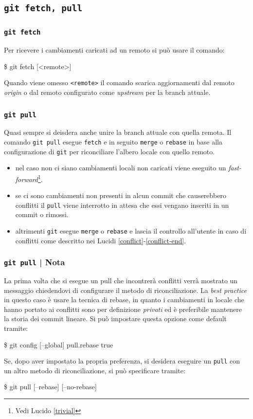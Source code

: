 \documentclass{beamer}
\begin{document}
\subsection{\texttt{git fetch, pull}}
\begin{frame}
  \frametitle{\texttt{git fetch}}
  Per ricevere i cambiamenti caricati ad un remoto si pu\`o usare il comando:
  \begin{semiverbatim}
  \$ git fetch [<remote>]
  \end{semiverbatim} \pause
  Quando viene omesso \texttt{<remote>} il comando scarica aggiornamenti dal
  remoto \emph{origin} o dal remoto configurato come \emph{upstream} per la
  branch attuale.
\end{frame}

\begin{frame}
  \frametitle{\texttt{git pull}}
  Quasi sempre si deisdera anche unire la branch attuale con quella remota.
  Il comando \texttt{git pull} esegue \texttt{fetch} e in seguito \texttt{merge}
  o \texttt{rebase} in base alla configurazione di \texttt{git} per riconciliare l'albero
  locale con quello remoto. \\ \pause
  \begin{itemize}
    \item nel caso non ci siano cambiamenti locali non caricati viene eseguito
      un \emph{fast-forward}\footnote{Vedi Lucido \ref{trivial}}.
    \item se ci sono cambiamenti non presenti in alcun commit che causerebbero
      conflitti il \texttt{pull} viene interrotto in attesa che essi vengano
      inseriti in un commit o rimossi.
    \item altrimenti \texttt{git} esegue \texttt{merge} o \texttt{rebase} e lascia il
      controllo all'utente in caso di conflitti come descritto nei
      Lucidi \ref{conflict}-\ref{conflict-end}.
  \end{itemize}
\end{frame}

\begin{frame}
  \frametitle{\texttt{git pull} | Nota}
  La prima volta che si esegue un pull che incontrer\`a conflitti verr\`a
  mostrato un messaggio chiedendovi di configurare il metodo di riconciliazione.
  La \emph{best practice} in questo caso \`e usare la tecnica di rebase, in
  quanto i cambiamenti in locale che hanno portato ai conflitti sono per
  definizione \emph{privati} ed \`e preferibile mantenere la storia dei commit
  lineare. Si pu\`o impostare questa opzione come default tramite:
  \begin{semiverbatim}
  \$ git config [--global] pull.rebase true
  \end{semiverbatim}
  \pause
  Se, dopo aver impostato la propria preferenza, si desidera eseguire un
  \texttt{pull} con un altro metodo di riconciliazione, si pu\`o specificare tramite:
  \begin{semiverbatim}
  \$ git pull [--rebase] [--no-rebase]
  \end{semiverbatim}
\end{frame}
\end{document}
